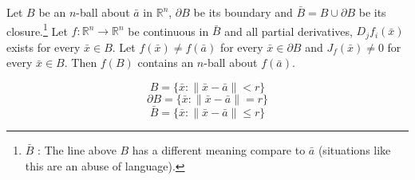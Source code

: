 \begin{theorem}
Let $B$ be an $n$-ball about $\bar{a}$ in $\mathbb{R}^n$, $\partial B$ be its boundary and $\bar{B} = B \cup \partial B$ be its closure.\footnote{$\bar{B}$ : The line above $B$ has a different meaning compare to $\bar{a}$ (situations like this are an abuse of language).}
Let $f : \mathbb{R}^n \to \mathbb{R}^n$ be continuous in $\bar{B}$ and all partial derivatives, $D_jf_i(\bar{x})$ exists for every $\bar{x} \in B$.
Let $f(\bar{x}) \ne f(\bar{a})$ for every $\bar{x} \in \partial B$ and $J_f(\bar{x}) \ne 0$ for every $\bar{x} \in B$.
Then $f(B)$ contains an $n$-ball about $f(\bar{a})$.
\begin{commentary}
\[ B = \{ \bar{x} : \| \bar{x} - \bar{a} \| < r \} \]
\[ \partial B = \{ \bar{x} : \| \bar{x} - \bar{a} \| = r \} \]
\[ \bar{B} = \{ \bar{x} : \| \bar{x} - \bar{a} \| \le r \} \]
\end{commentary}
\end{theorem}

